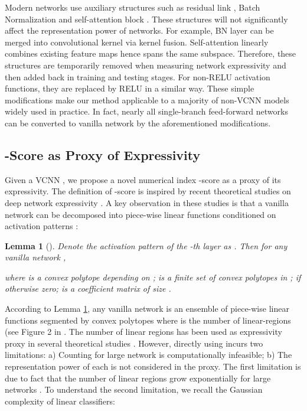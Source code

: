 \documentclass{article}
\newtheorem{lem}{Lemma}
\begin{document}
Modern networks use auxiliary structures such as residual link , Batch Normalization and self-attention block \cite{huSqueezeandExcitationNetworks2018}. These structures will not significantly affect the representation power of networks. For example, BN layer can be merged into convolutional kernel via kernel fusion. Self-attention linearly combines existing feature maps hence spans the same subspace. Therefore, these structures are temporarily removed  when measuring network expressivity and then added back in training and testing stages. For non-RELU activation functions, they are replaced by RELU in a similar way. These simple modifications make our method applicable to a majority of non-VCNN models widely used in practice. In fact, nearly all single-branch feed-forward networks can be converted to vanilla network by the aforementioned modifications.

\subsection{-Score as Proxy of Expressivity}

Given a VCNN ,  we propose a novel numerical index -score as a proxy of its expressivity.  The definition of -score is inspired by recent theoretical studies on deep network expressivity \cite{serraBoundingCountingLinear2018,xiongNumberLinearRegions2020}. A key observation in these studies is that a vanilla network can be decomposed into piece-wise linear functions conditioned on  activation patterns \cite{montufarNumberLinearRegions2014}:

\begin{lem}[\cite{montufarNumberLinearRegions2014,maithraraghuExpressivePowerDeep2017}]
  \label{prop:vcnn-is-linear}
  Denote the activation pattern of the -th layer as . Then for any vanilla network ,
  
  where  is a convex polytope depending on ;  is a finite set of convex polytopes in ;   if  otherwise zero;  is a coefficient matrix of size .
\end{lem}







According to Lemma \ref{prop:vcnn-is-linear}, any vanilla network is an ensemble of piece-wise linear functions segmented by convex polytopes  where  is the number of linear-regions (see Figure 2 in \cite{haninComplexityLinearRegions2019}. The number of linear regions  has been used as expressivity proxy in several theoretical studies \cite{montufarNumberLinearRegions2014,serraBoundingCountingLinear2018,haninComplexityLinearRegions2019,zhangEmpiricalStudiesProperties2019,xiongNumberLinearRegions2020}. However, directly using  incurs two limitations: a) Counting  for large network is computationally infeasible; b) The representation power of each  is not considered in the proxy. The first limitation is due to fact that the  number of linear regions grow exponentially for large networks \cite{montufarNumberLinearRegions2014,xiongNumberLinearRegions2020}. To understand the second limitation, we recall the Gaussian complexity \cite{kakadeComplexityLinearPrediction2008} of linear classifiers:
\end{document}
